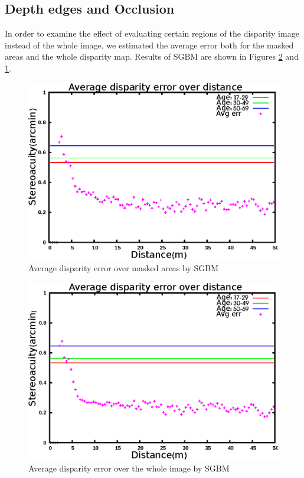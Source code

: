 \subsection{Depth edges and Occlusion}
In order to examine the effect of evaluating certain regions of the disparity image instead of the whole image, 
we estimated the average error both for the masked areas and the whole disparity map. 
Results of SGBM are shown in Figures \ref{fig:sgbmfull3} and \ref{fig:sgbmmsk3}.

\begin{figure}[H]
\centering
\includegraphics[scale=0.8]{sgbmmsk3}
\caption{Average disparity error over masked areas by SGBM}
\label{fig:sgbmmsk3}
\end{figure} 

\begin{figure}[H]
\centering
\includegraphics[scale=0.8]{sgbmfull3}
\caption{Average disparity error over the whole image by SGBM}
\label{fig:sgbmfull3}
\end{figure} 

